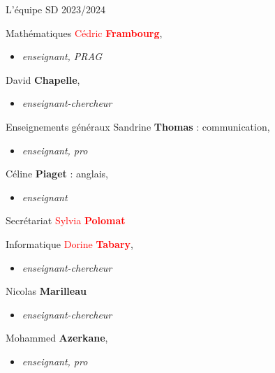 \documentclass [xcolor=x11names,t] {beamer}
\begin{document}
\begin{frame}{L'équipe SD 2023/2024}

\begin{minipage}{0.5\textwidth}
\begin{block}{Mathématiques}
    \textcolor{red}{Cédric \textbf{Frambourg}},
    \begin{itemize}
        \item \textcolor{gray!50!black}{\textit{enseignant, PRAG}}
    \end{itemize}
    David \textbf{Chapelle},
    \begin{itemize}
    \item \textcolor{gray!50!black}{\textit{enseignant-chercheur}}
    \end{itemize}
\end{block}

\begin{block}{Enseignements généraux}
	Sandrine \textbf{Thomas} : communication, 
	\begin{itemize}
		\item \textcolor{gray!50!black}{\textit{enseignant, pro}}
	\end{itemize}
	Céline \textbf{Piaget} : anglais, 
	\begin{itemize}
	\item \textcolor{gray!50!black}{\textit{enseignant}}
	\end{itemize}
\end{block}
\end{minipage}\hfill
\begin{minipage}{0.45\textwidth}
	\begin{block}{Secrétariat}
		\textcolor{red}{Sylvia \textbf{Polomat}}
	\end{block}
	
\begin{block}{Informatique}
   \textcolor{red}{ Dorine \textbf{Tabary}},
    \begin{itemize}
        \item \textcolor{gray!50!black}{\textit{enseignant-chercheur}}
    \end{itemize}
    Nicolas \textbf{Marilleau}
    \begin{itemize}
        \item \textcolor{gray!50!black}{\textit{enseignant-chercheur}}
    \end{itemize}
    Mohammed \textbf{Azerkane}, 
    \begin{itemize}
        \item \textcolor{gray!50!black}{\textit{enseignant, pro}}
    \end{itemize}
\end{block}
\end{minipage}
    
\end{frame}
\end{document}

